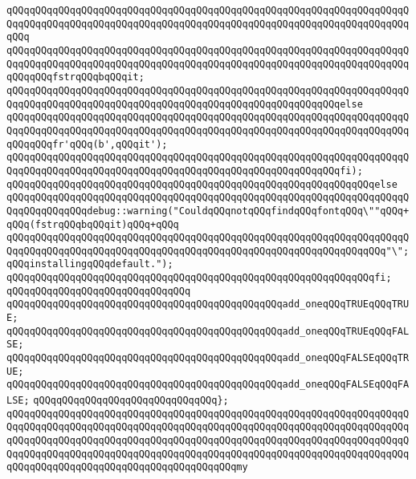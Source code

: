 \verb|qQQqqQQqqQQqqQQqqQQqqQQqqQQqqQQqqQQqqQQqqQQqqQQqqQQqqQQqqQQqqQQqqQQqqQQqqQQqqQQqqQQqqQQqqQQqqQQqqQQqqQQqqQQqqQQqqQQqqQQqqQQqqQQqqQQqqQQqqQQqqQQq|\newline
\verb|qQQqqQQqqQQqqQQqqQQqqQQqqQQqqQQqqQQqqQQqqQQqqQQqqQQqqQQqqQQqqQQqqQQqqQQqqQQqqQQqqQQqqQQqqQQqqQQqqQQqqQQqqQQqqQQqqQQqqQQqqQQqqQQqqQQqqQQqqQQqqQQqqQQqfstrqQQqbqQQqit;|\newline
\verb|qQQqqQQqqQQqqQQqqQQqqQQqqQQqqQQqqQQqqQQqqQQqqQQqqQQqqQQqqQQqqQQqqQQqqQQqqQQqqQQqqQQqqQQqqQQqqQQqqQQqqQQqqQQqqQQqqQQqqQQqqQQqqQQqelse|\newline
\verb|qQQqqQQqqQQqqQQqqQQqqQQqqQQqqQQqqQQqqQQqqQQqqQQqqQQqqQQqqQQqqQQqqQQqqQQqqQQqqQQqqQQqqQQqqQQqqQQqqQQqqQQqqQQqqQQqqQQqqQQqqQQqqQQqqQQqqQQqqQQqqQQqqQQqfr'qQQq(b',qQQqit');|\newline
\verb|qQQqqQQqqQQqqQQqqQQqqQQqqQQqqQQqqQQqqQQqqQQqqQQqqQQqqQQqqQQqqQQqqQQqqQQqqQQqqQQqqQQqqQQqqQQqqQQqqQQqqQQqqQQqqQQqqQQqqQQqqQQqqQQqfi);|\newline
\verb|qQQqqQQqqQQqqQQqqQQqqQQqqQQqqQQqqQQqqQQqqQQqqQQqqQQqqQQqqQQqqQQqelse|\newline
\verb|qQQqqQQqqQQqqQQqqQQqqQQqqQQqqQQqqQQqqQQqqQQqqQQqqQQqqQQqqQQqqQQqqQQqqQQqqQQqqQQqqQQqdebug::warning("CouldqQQqnotqQQqfindqQQqfontqQQq\""qQQq+qQQq(fstrqQQqbqQQqit)qQQq+qQQq|\newline
\verb|qQQqqQQqqQQqqQQqqQQqqQQqqQQqqQQqqQQqqQQqqQQqqQQqqQQqqQQqqQQqqQQqqQQqqQQqqQQqqQQqqQQqqQQqqQQqqQQqqQQqqQQqqQQqqQQqqQQqqQQqqQQqqQQqqQQqqQQq"\";qQQqinstallingqQQqdefault.");|\newline
\verb|qQQqqQQqqQQqqQQqqQQqqQQqqQQqqQQqqQQqqQQqqQQqqQQqqQQqqQQqqQQqqQQqfi;|\newline
\verb|qQQqqQQqqQQqqQQqqQQqqQQqqQQqqQQq|\newline
\verb|qQQqqQQqqQQqqQQqqQQqqQQqqQQqqQQqqQQqqQQqqQQqqQQqadd_oneqQQqTRUEqQQqTRUE;|\newline
\verb|qQQqqQQqqQQqqQQqqQQqqQQqqQQqqQQqqQQqqQQqqQQqqQQqadd_oneqQQqTRUEqQQqFALSE;|\newline
\verb|qQQqqQQqqQQqqQQqqQQqqQQqqQQqqQQqqQQqqQQqqQQqqQQqadd_oneqQQqFALSEqQQqTRUE;|\newline
\verb|qQQqqQQqqQQqqQQqqQQqqQQqqQQqqQQqqQQqqQQqqQQqqQQqadd_oneqQQqFALSEqQQqFALSE;|\newline
\verb|qQQqqQQqqQQqqQQqqQQqqQQqqQQqqQQq};|\newline
\newline
\verb|qQQqqQQqqQQqqQQqqQQqqQQqqQQqqQQqqQQqqQQqqQQqqQQqqQQqqQQqqQQqqQQqqQQqqQQqqQQqqQQqqQQqqQQqqQQqqQQqqQQqqQQqqQQqqQQqqQQqqQQqqQQqqQQqqQQqqQQqqQQqqQQqqQQqqQQqqQQqqQQqqQQqqQQqqQQqqQQqqQQqqQQqqQQqqQQqqQQqqQQqqQQqqQQqqQQqqQQqqQQqqQQqqQQqqQQqqQQqqQQqqQQqqQQqqQQqqQQqqQQqqQQqqQQqqQQqqQQqqQQqqQQqqQQqqQQqqQQqqQQqqQQqqQQqqQQqqQQqqQQqmy|\newline
